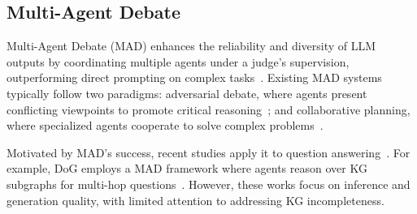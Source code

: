 


\subsection{Multi-Agent Debate}
Multi-Agent Debate (MAD) enhances the reliability and diversity of LLM outputs by coordinating multiple agents under a judge's supervision, outperforming direct prompting on complex tasks~\cite{liang2023encouraging,chan2023chateval,qianscaling}.
Existing MAD systems typically follow two paradigms: adversarial debate, where agents present conflicting viewpoints to promote critical reasoning~\cite{liang2023encouraging,liu2024groupdebate}; and collaborative planning, where specialized agents cooperate to solve complex problems~\cite{du2023improving,haase2025beyond}.

Motivated by MAD's success, recent studies apply it to question answering~\cite{mao2025multi,ma2025debate,hu2024multi}. For example, DoG employs a MAD framework where agents reason over KG subgraphs for multi-hop questions~\cite{ma2025debate}. However, these works focus on inference and generation quality, with limited attention to addressing KG incompleteness.

